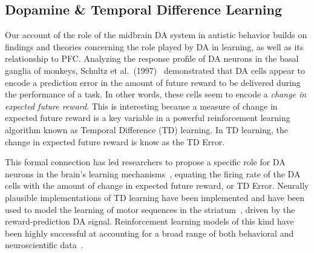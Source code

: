 \subsection{Dopamine \& Temporal Difference Learning}
Our account of the role of the midbrain DA system in autistic behavior builds on findings and theories concerning the role played by DA in learning, as well as its relationship to PFC. Analyzing the response profile of DA neurons in the basal ganglia of monkeys, Schultz et al.~(1997)~\nocite{SchultzW:1997:TD} demonstrated that DA cells appear to encode a prediction error in the amount of future reward to be delivered during the performance of a task. In other words, these cells seem to encode a \emph{change in expected future reward}. This is interesting because a measure of change in expected future reward is a key variable in a powerful reinforcement learning algorithm known as Temporal Difference (TD) learning. In TD learning, the change in expected future reward is know as the TD Error. %


This formal connection has led researchers to propose a specific role for DA neurons in the brain's learning mechanisms~\cite{MontaguePR:1996:Dopamine}, equating the firing rate of the DA cells with the amount of change in expected future reward, or TD Error. Neurally plausible implementations of TD learning have been implemented and have been used to model the learning of motor sequences in the striatum~\cite{BartoAG:1994:TDLearning}, driven by the reward-prediction DA signal. Reinforcement learning models of this kind have been highly successful at accounting for a broad range of both behavioral and neuroscientific data~\cite{DayanP:2008:Ugly}.


